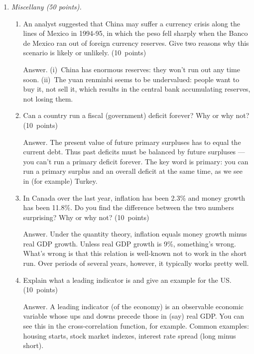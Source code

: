 \documentclass[letterpaper,12pt]{article}
\begin{document}
\begin{enumerate}
\item {\it Miscellany (50 points).}

\begin{enumerate}
\item An analyst suggested that China may suffer a currency crisis
along the lines of Mexico in 1994-95,
in which the peso fell sharply when the Banco de Mexico
ran out of foreign currency reserves.
Give two reasons why this scenario is likely or unlikely.
 (10~points)

Answer.  (i)~China has enormous reserves:  they won't run out any time soon.
(ii)~The yuan renminbi seems to be undervalued:  people want to buy it,
not sell it, which results in the central bank accumulating reserves,
not losing them.


\item Can a country run a fiscal (government) deficit forever?
Why or why not?
 (10~points)

Answer.  The present value of future primary surpluses has to equal
the current debt.  Thus past deficits must be balanced by future
surpluses --- you can't run a primary deficit forever. The key word
is primary:  you can run a primary surplus and an overall deficit at
the same time, as we see in (for example) Turkey.


\item In Canada over the last year, inflation has been 2.3\%
and money growth  has been 11.8\%.
Do you find the difference between the two numbers surprising?
Why or why not?  (10~points)

Answer. Under the quantity theory, inflation equals money growth
minus real GDP growth. Unless real GDP growth is 9\%, something's
wrong. What's wrong is that this relation is well-known not to work
in the short run.  Over periods of several years, however, it
typically works pretty well.

\item Explain what a leading indicator is
and give an example for the US.  (10~points)

Answer.  A leading indicator (of the economy)
is an observable economic variable whose ups and
downs precede those in (say) real GDP.
You can see this in the cross-correlation function, for example.
Common examples:  housing starts, stock market indexes,
interest rate spread (long minus short).


\end{enumerate}
\end{enumerate}
\end{document}
